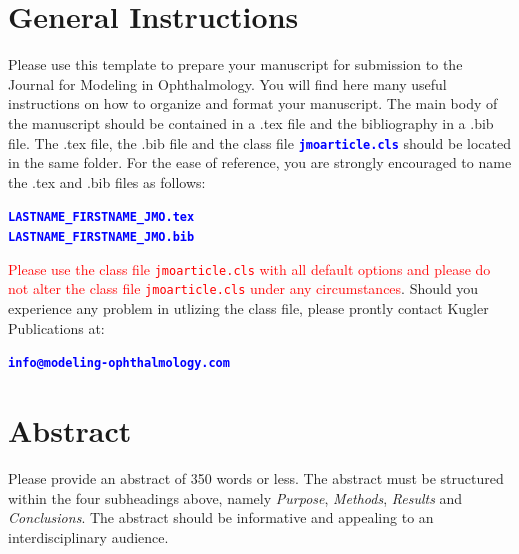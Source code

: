 \documentclass{jmoarticle}
\begin{document}
\jmoMakeFrontpage


\section{General Instructions}

Please use this template to prepare your manuscript for submission to the
Journal for Modeling in Ophthalmology.  You will find here many useful
instructions on how to organize and format your manuscript.  The main body of
the manuscript should be contained in a .tex file and the bibliography in a
.bib file.  The .tex file, the .bib file and the class file
\textbf{\textcolor{blue}{\texttt{jmoarticle.cls}}} should be located in the
same folder.  For the ease of reference, you are strongly encouraged to name
the .tex and .bib files as follows:

\noindent
\begin{center}
\textbf{\textcolor{blue}{
\texttt{LASTNAME\_FIRSTNAME\_JMO.tex} \\
\texttt{LASTNAME\_FIRSTNAME\_JMO.bib}}
}
\end{center}

\noindent
\textcolor{red}{Please use the class file \texttt{jmoarticle.cls} with all
default options and please do not alter the class file \texttt{jmoarticle.cls}
under any circumstances}.
Should you experience any problem in utlizing the class file, please prontly
contact Kugler Publications at:

\noindent
\begin{center}
\textbf{\textcolor{blue}{
\texttt{info@modeling-ophthalmology.com}
}}
\end{center}

\section{Abstract}

Please provide an abstract of 350 words or less. The abstract must be
structured within the four subheadings above, namely \textit{Purpose},
\textit{Methods}, \textit{Results} and \textit{Conclusions}. The abstract
should be informative and appealing to an interdisciplinary audience.
\end{document}

